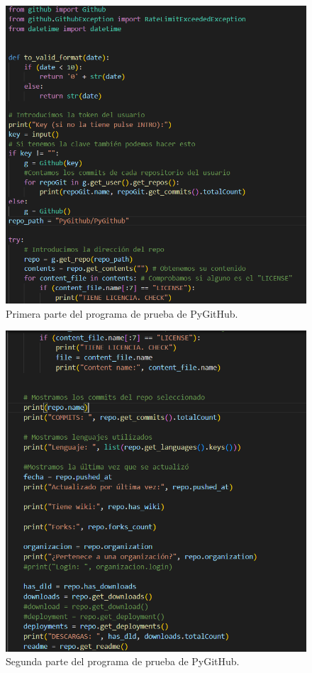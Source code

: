 \documentclass[a4paper, 12pt]{book}
\begin{document}
\begin{figure}
    \centering
    \includegraphics[width=1\textwidth, keepaspectratio]{img/pygithub_1.png}
    \caption{Primera parte del programa de prueba de PyGitHub.}\label{fig:pygithub_1}
\end{figure}

\begin{figure}
    \centering
    \includegraphics[width=1\textwidth, keepaspectratio]{img/pygithub_2.png}
    \caption{Segunda parte del programa de prueba de PyGitHub.}\label{fig:pygithub_2}
\end{figure}
  
\end{document}
